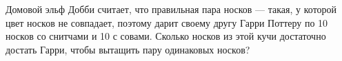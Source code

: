 \question
Домовой эльф Добби считает, что правильная пара носков — такая, у которой цвет носков не совпадает, поэтому дарит своему другу Гарри Поттеру по 10 носков со снитчами и 10 с совами. Сколько носков из этой кучи достаточно достать Гарри, чтобы вытащить пару одинаковых носков?
